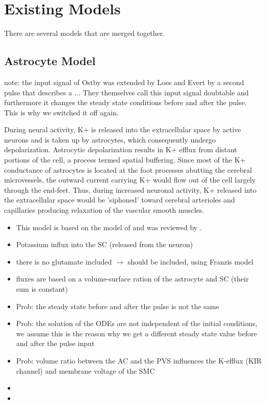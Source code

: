 \section{Existing Models}
There are several models that are merged together.

\subsection{Astrocyte Model}
note: the input signal of Ostby was extended by Loes and Evert by a second pulse that describes a ... They themselves call this input signal doubtable and furthermore it changes the steady state conditions before and after the pulse. This is why we switched it off again.


\cite{Iadecola1993} During neural activity, K+ is released into the extracellular space by active neurons and is taken up by astrocytes, which consequently undergo depolarization. Astrocytic depolarization results in K+ efflux from distant portions of the cell, a process termed spatial buffering. Since most of the K+ conductance of astrocytes is located at the foot processes abutting the cerebral microvessels, the outward current carrying K+ would flow out of the cell largely through the end-feet. Thus, during increased neuronal activity, K+ released into the extracellular space would be 'siphoned' toward cerebral arterioles and capillaries producing relaxation of the vascular smooth muscles.




\begin{itemize}
\item This model is based on the model of \citet{Ostby2009} and was reviewed by  \citet{LoesEvert}.
\item Potassium influx into the SC (released from the neuron)
\item there is no glutamate included $ \rightarrow $ should be included, using Franzis model
\item fluxes are based on a volume-surface ration of the astrocyte and SC (their sum is constant)
\item Prob: the steady state before and after the pulse is not the same
\item Prob: the solution of the ODEs are not independent of the initial conditions, we assume this is the reason why we get a different steady state value before and after the pulse input
\item Prob: volume ratio between the AC and the PVS influences the K-efflux (KIR channel) and membrane voltage of the SMC
\item {}
\item {}
\end{itemize}


